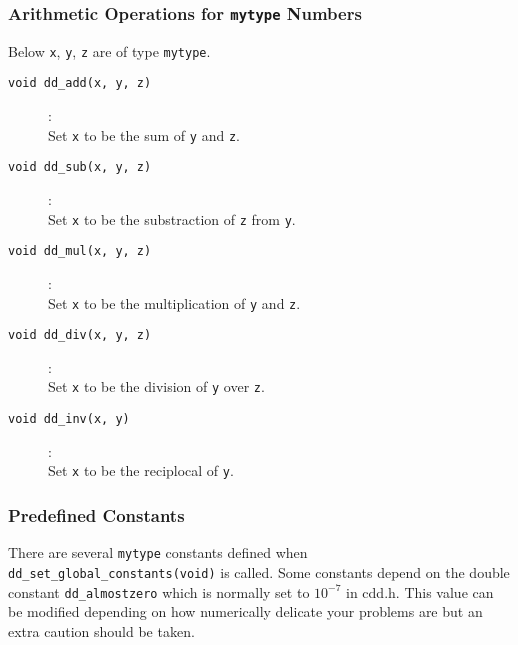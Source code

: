 \documentclass[11pt]{article}
\newcommand {\0} {{\bf 0}}
\begin{document}
\subsubsection{Arithmetic Operations for {\tt mytype} Numbers}

Below  {\tt x}, {\tt y}, {\tt z}  are of type {\tt mytype}.

\begin{description}

\item[{\tt void dd\_add(x, y, z)}]:\\
Set {\tt x} to be the sum of  {\tt y} and  {\tt z}.

\item[{\tt void dd\_sub(x, y, z)}]:\\
Set {\tt x} to be the substraction of  {\tt z}  from  {\tt y}.

\item[{\tt void dd\_mul(x, y, z)}]:\\
Set {\tt x} to be the multiplication of  {\tt y}  and  {\tt z}.

\item[{\tt void dd\_div(x, y, z)}]:\\
Set {\tt x} to be the division of  {\tt y}  over  {\tt z}.

\item[{\tt void dd\_inv(x, y)}]:\\
Set {\tt x} to be the reciplocal of  {\tt y}.

\end{description}


\subsubsection{Predefined  Constants} \label{constants}

There are several {\tt mytype} constants defined when {\tt dd\_set\_global\_constants(void)} is called.
Some constants depend on the double constant {\tt dd\_almostzero} which is normally set to $10^{-7}$ in cdd.h.
This value can be modified depending on how numerically delicate your problems are but an extra
caution should be taken.
\end{document}

